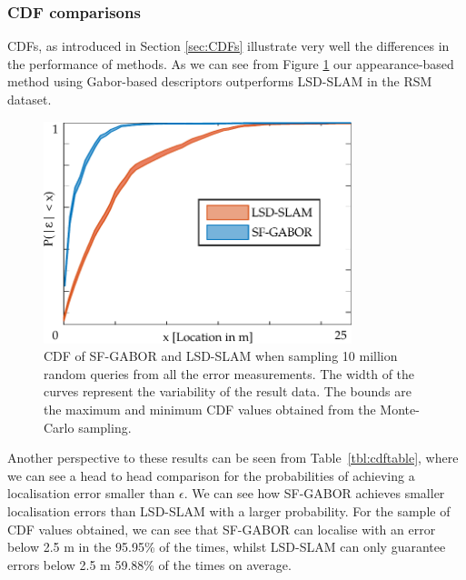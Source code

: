 \subsubsection{CDF comparisons}

CDFs, as introduced in Section \ref{sec:CDFs} illustrate very well the differences in the performance of methods. As we can see from Figure \ref{fig:cdf} our appearance-based method using Gabor-based descriptors outperforms LSD-SLAM in the RSM dataset. 

\begin{figure}
\centering
\includegraphics[width=0.8\textwidth]{gfx/Chapter04/SF_GABORvsLSD_SLAM.pdf}
\caption{CDF of SF-GABOR and LSD-SLAM when sampling 10 million random queries from all the error measurements. The width of the curves represent the variability of the result data. The bounds are the maximum and minimum CDF values obtained from the Monte-Carlo sampling.}
\label{fig:cdf}
\end{figure}

Another perspective to these results can be seen from Table~\ref{tbl:cdftable}, where we can see a head to head comparison for the probabilities of achieving a localisation error smaller than $\epsilon$. We can see how SF-GABOR achieves smaller localisation errors than LSD-SLAM with a larger probability. For the sample of CDF values obtained, we can see that SF-GABOR can localise with an error below 2.5 m in the 95.95\% of the times, whilst LSD-SLAM can only guarantee errors below 2.5 m 59.88\% of the times on average.

